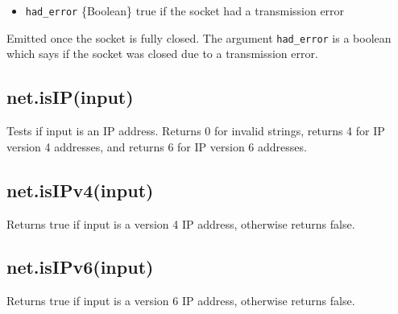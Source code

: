 \begin{itemize}
\itemsep1pt\parskip0pt
\item
  \texttt{had\_error} \{Boolean\} true if the socket had a transmission
  error
\end{itemize}

Emitted once the socket is fully closed. The argument
\texttt{had\_error} is a boolean which says if the socket was closed due
to a transmission error.

\subsection{net.isIP(input)}\label{net.isipinput}

Tests if input is an IP address. Returns 0 for invalid strings, returns
4 for IP version 4 addresses, and returns 6 for IP version 6 addresses.

\subsection{net.isIPv4(input)}\label{net.isipv4input}

Returns true if input is a version 4 IP address, otherwise returns
false.

\subsection{net.isIPv6(input)}\label{net.isipv6input}

Returns true if input is a version 6 IP address, otherwise returns
false.
